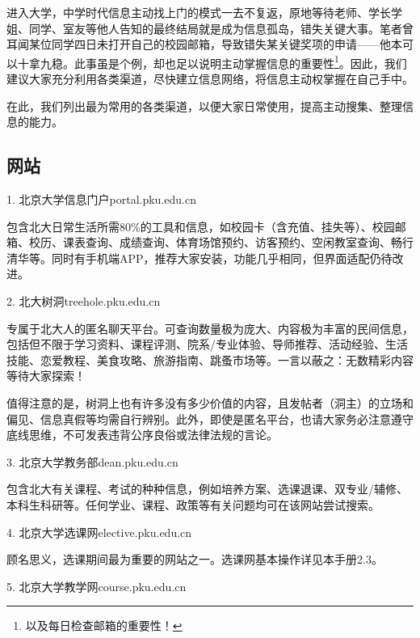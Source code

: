 \documentclass[11pt,oneside]{book}
\begin{document}
进入大学，中学时代信息主动找上门的模式一去不复返，原地等待老师、学长学姐、同学、室友等他人告知的最终结局就是成为信息孤岛，错失关键大事。笔者曾耳闻某位同学四日未打开自己的校园邮箱，导致错失某关键奖项的申请——他本可以十拿九稳。此事虽是个例，却也足以说明主动掌握信息的重要性\footnote{以及每日检查邮箱的重要性！}。因此，我们建议大家充分利用各类渠道，尽快建立信息网络，将信息主动权掌握在自己手中。

在此，我们列出最为常用的各类渠道，以便大家日常使用，提高主动搜集、整理信息的能力。

\subsection{网站}

1. 北京大学信息门户\quad portal.pku.edu.cn

包含北大日常生活所需80\%的工具和信息，如校园卡（含充值、挂失等）、校园邮箱、校历、课表查询、成绩查询、体育场馆预约、访客预约、空闲教室查询、畅行清华等。同时有手机端APP，推荐大家安装，功能几乎相同，但界面适配仍待改进。

\vspace{20pt}

2. 北大树洞\quad treehole.pku.edu.cn

专属于北大人的匿名聊天平台。可查询数量极为庞大、内容极为丰富的民间信息，包括但不限于学习资料、课程评测、院系/专业体验、导师推荐、活动经验、生活技能、恋爱教程、美食攻略、旅游指南、跳蚤市场等。一言以蔽之：无数精彩内容等待大家探索！

值得注意的是，树洞上也有许多没有多少价值的内容，且发帖者（洞主）的立场和偏见、信息真假等均需自行辨别。此外，即使是匿名平台，也请大家务必注意遵守底线思维，不可发表违背公序良俗或法律法规的言论。

\vspace{20pt}

3. 北京大学教务部\quad dean.pku.edu.cn

包含北大有关课程、考试的种种信息，例如培养方案、选课退课、双专业/辅修、本科生科研等。任何学业、课程、政策等有关问题均可在该网站尝试搜索。

\vspace{20pt}

4. 北京大学选课网\quad elective.pku.edu.cn

顾名思义，选课期间最为重要的网站之一。选课网基本操作详见本手册2.3。

\vspace{20pt}

5. 北京大学教学网\quad course.pku.edu.cn
\end{document}
